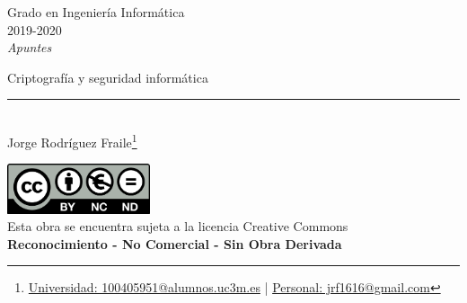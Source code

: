 \documentclass[12pt, twoside, openright]{report} %
\begin{document}
	
\begin{titlepage}
	\begin{sffamily}
	\color{azulUC3M}
	\begin{center}
		\begin{figure}[H] %
		\end{figure}
		\vspace{2.5cm}
		\begin{Large}
			Grado en Ingeniería Informática\\			
			2019-2020\\
			\vspace{2cm}		
			\textsl{Apuntes}\\
			\bigskip
		\end{Large}
		 	{\Huge Criptografía y seguridad informática}\\
		 	\vspace*{0.5cm}
	 		\rule{10.5cm}{0.1mm}\\
			\vspace*{0.9cm}
			{\LARGE Jorge Rodríguez Fraile\footnote{\href{mailto:100405951@alumnos.uc3m.es}{Universidad: 100405951@alumnos.uc3m.es}  |  \href{mailto:jrf1616@gmail.com}{Personal: jrf1616@gmail.com}}}\\ 
			\vspace*{1cm}
	\end{center}
	\vfill
	\color{black}
		\includegraphics[width=4.2cm]{img/creativecommons.png}\\
		Esta obra se encuentra sujeta a la licencia Creative Commons\\ \textbf{Reconocimiento - No Comercial - Sin Obra Derivada}
	\end{sffamily}
\end{titlepage}


\tableofcontents
\thispagestyle{fancy}
\end{document}
